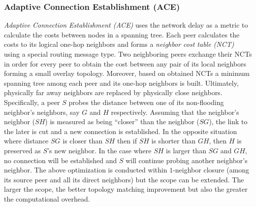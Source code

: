 \subsubsection{Adaptive Connection Establishment (ACE)}
\emph{Adaptive Connection Establishment (ACE)} \cite{LZXN2004} uses the network
delay as a metric to calculate the costs between nodes in a spanning tree.
Each peer calculates the costs to its logical one-hop
neighbors and forms a \emph{neighbor cost table (NCT)} using a special
routing message type. Two neighboring peers exchange their NCTs in order for
every peer to obtain the cost between any pair of its local neighbors forming a
small overlay topology. Moreover, based on obtained NCTs a minimum spanning tree
among each peer and its one-hop neighbors is built. Ultimately, physically
far away neighbors are replaced by physically close neighbors. Specifically, a peer
$S$ probes the distance between one of its non-flooding neighbor's neighbors,
say $G$ and $H$ respectively. Assuming that the neighbor's neighbor ($SH$) is
measured as being ``closer'' than the neighbor ($SG$), the link to the later
is cut and a new connection is established. In the opposite situation where
distance $SG$ is closer than $SH$ then if $SH$ is shorter than $GH$, then $H$ is
preserved as $S$'s new neighbor. In the case where $SH$ is larger than $SG$ and
$GH$, no connection will be established and $S$ will continue probing another
neighbor's neighbor. The above optimization is conducted within $1$-neighbor
closure (among its source peer and all its direct neighbors) but the scope can
be extended. The larger the scope, the better topology matching improvement but
also the greater the computational overhead.

%
%
%

